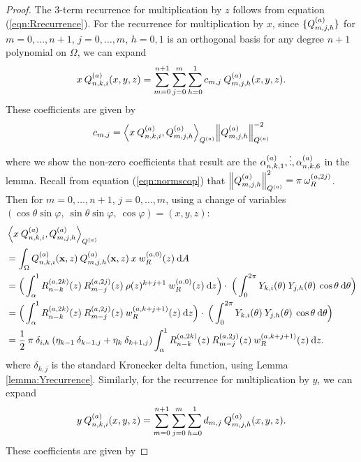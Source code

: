 \documentclass[11pt, oneside]{article}   	%
\begin{document}
\begin{proof}
	The 3-term recurrence for multiplication by $z$ follows from equation (\ref{eqn:Rrecurrence}). For the recurrence for multiplication by $x$, since $\{Q_{m,j,h}^{(a)}\}$ for $m = 0,\dots,n+1$, $j = 0,\dots,m$, $h = 0,1$ is an orthogonal basis for any degree $n+1$ polynomial on $\Omega$, we can expand 
\begin{align*}
	x \: Q_{n,k,i}^{(a)}(x,y,z) = \sum_{m=0}^{n+1} \sum_{j=0}^m \sum_{h=0}^1 c_{m,j} \: Q_{m,j,h}^{(a)}(x,y,z).
\end{align*}
These coefficients are given by
\begin{align*}
	c_{m,j} = {\ip< x \: \scopnkia, \scopmjha >_{\scopa}}{\norm{\scopmjha}^{-2}_{\scopa}}
\end{align*}
where we show the non-zero coefficients that result are the $\alpha^{(a)}_{n,k,1},\vdots,\alpha^{(a)}_{n,k,6}$ in the lemma.
Recall from equation (\ref{eqn:normscop}) that $\left\| Q_{m,j,h}^{(a)} \right\|_{Q^{(a)}}^2 = \pi \: \omega_R^{(a,2j)}$. Then for $m = 0,\dots,n+1$, $j = 0,\dots,m$, using a change of variables $(\cos\theta \sin\varphi, \: \sin\theta\sin\varphi, \: \cos\varphi) = (x, y, z)$:
\begin{align*}
	&\ip<x \: \scopnkia, \scopmjha>_{\scopa} \\
	&= \int_\Omega \scopnkia(\xvec,z) \: \scopmjha(\xvec,z) \: x \: \genjacw^{(a,0)}(z) \: \D A \\
	&= \Big( \int^1_\alpha \genjacnmk^{(a, 2k)}(z) \: \genjacmmj^{(a, 2j)}(z) \: \rho(z)^{k+j+1} \: \genjacw^{(a, 0)}(z) \: \D z \Big) \cdot \: \Big( \int_0^{2\pi} \chki(\theta) \: \chjh(\theta) \: \cos\theta \: \D \theta \Big) \\
	&= \Big( \int^1_\alpha \genjacnmk^{(a, 2k)}(z) \: \genjacmmj^{(a, 2j)}(z) \: \genjacw^{(a, k + j + 1)}(z) \: \D z \Big) \cdot \: \Big( \int_0^{2\pi} \chki(\theta) \: \chjh(\theta) \: \cos\theta \: \D \theta \Big) \\
	&= \half \: \pi \: \delta_{i,h} \: (\eta_{k-1} \: \delta_{k-1, j} + \eta_{k} \: \delta_{k+1, j})  \int^1_\alpha \genjacnmk^{(a, 2k)}(z) \: \genjacmmj^{(a, 2j)}(z) \: \genjacw^{(a, k + j + 1)}(z) \: \D z.
\end{align*}
where $\delta_{k, j}$ is the standard Kronecker delta function, using Lemma \ref{lemma:Yrecurrence}. Similarly, for the recurrence for multiplication by $y$, we can expand 
\begin{align*}
	y \: Q_{n,k,i}^{(a)}(x,y,z) = \sum_{m=0}^{n+1} \sum_{j=0}^m \sum_{h=0}^1 d_{m,j} \: Q_{m,j,h}^{(a)}(x,y,z).
\end{align*}
These coefficients are given by

\end{proof}
\end{document}
